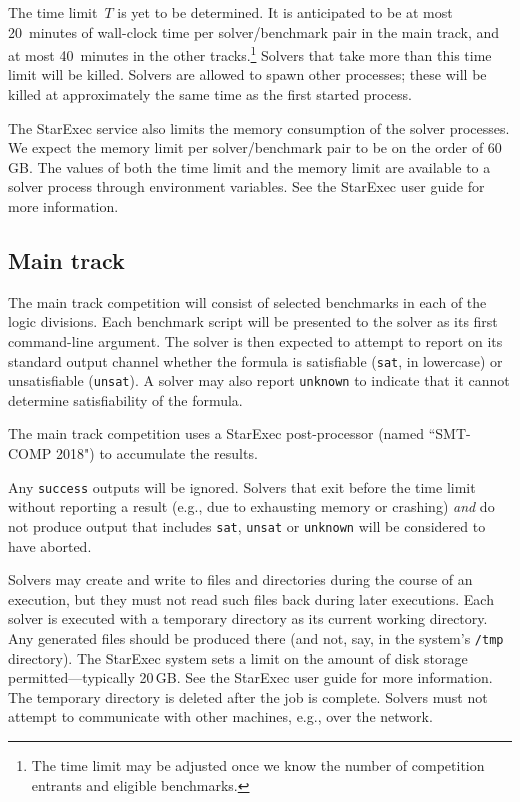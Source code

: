 \documentclass[12pt]{article}
\begin{document}
The time limit~$T$ is yet to be determined.  It is anticipated to be
at most 20~minutes of wall-clock time per solver/benchmark pair in the
main track, and at most 40~minutes in the other tracks.\footnote{The
  time limit may be adjusted once we know the number of competition
  entrants and eligible benchmarks.}  Solvers that take more than this
time limit will be killed.  Solvers are allowed to spawn other
processes; these will be killed at approximately the same time as the
first started process.

The StarExec service also limits the memory consumption of the solver
processes.  We expect the memory limit per solver/benchmark pair to be
on the order of 60\,GB.  The values of both the time limit and the
memory limit are available to a solver process through environment
variables.  See the StarExec user guide for more information.

\subsection{Main track}
\label{sec:exec:main}

The main track competition will consist of selected benchmarks in each
of the logic divisions.  Each benchmark script will be presented to
the solver as its first command-line argument.  The solver is then
expected to attempt to report on its standard output channel whether
the formula is satisfiable (\texttt{sat}, in lowercase) or
unsatisfiable (\texttt{unsat}).  A solver may also report
\texttt{unknown} to indicate that it cannot determine satisfiability
of the formula.

The main track competition uses a StarExec post-processor (named
``SMT-COMP 2018") to accumulate the results.

%
Any \texttt{success} outputs will be ignored.  Solvers that exit
before the time limit without reporting a result (e.g., due to
exhausting memory or crashing) \emph{and} do not produce output that
includes \texttt{sat}, \texttt{unsat} or \texttt{unknown} will be
considered to have aborted.

%
Solvers may create and write to files and directories during the
course of an execution, but they must not read such files back during
later executions.  Each solver is executed with a temporary directory
as its current working directory.  Any generated files should be
produced there (and not, say, in the system's \texttt{/tmp}
directory).  The StarExec system sets a limit on the amount of disk
storage permitted---typically 20\,GB.  See the StarExec user guide for
more information.  The temporary directory is deleted after the job is
complete.  Solvers must not attempt to communicate with other
machines, e.g., over the network.
\end{document}
